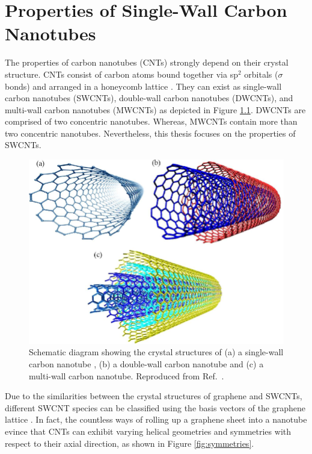 \chapter{Properties of Single-Wall Carbon Nanotubes}

The properties of carbon nanotubes (CNTs) strongly depend on their crystal structure. CNTs consist of carbon atoms bound together via sp$^2$ orbitals ($\sigma$ bonds) and arranged in a honeycomb lattice \cite{soavi2016ultrafast}. They can exist as single-wall carbon nanotubes (SWCNTs), double-wall carbon nanotubes (DWCNTs), and multi-wall carbon nanotubes (MWCNTs) as depicted in Figure \ref{fig:swcnt_mwcnt}. DWCNTs are comprised of two concentric nanotubes. Whereas, MWCNTs contain more than two concentric nanotubes. Nevertheless, this thesis focuses on the properties of SWCNTs. 

\begin{figure}[ht]
	\centering
	\includegraphics[scale=1]{images/chapter_optical_props/swcnt_mwcnt_rafiq}
	\caption{Schematic diagram showing the crystal structures of (a) a single-wall carbon nanotube , (b) a double-wall carbon nanotube  and (c) a multi-wall carbon nanotube. Reproduced from Ref.\ \cite{rafique2016exploration}.}
	\label{fig:swcnt_mwcnt}
\end{figure}

Due to the similarities between the crystal structures of graphene and SWCNTs, different SWCNT species can be classified using the basis vectors of the graphene lattice \cite{charlier2007electronic}. In fact, the countless ways of rolling up a graphene sheet into a nanotube evince that CNTs can exhibit varying helical geometries and symmetries with respect to their axial direction, as shown in Figure \ref{fig:symmetries}.

